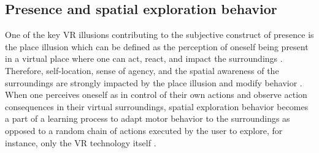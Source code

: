 \subsection{Presence and spatial exploration behavior}

One of the key VR illusions contributing to the subjective construct of presence is the place illusion which can be defined as the perception of oneself being present in a virtual place where one can act, react, and impact the surroundings \cite{Slater2009}. Therefore, self-location, sense of agency, and the spatial awareness of the surroundings are strongly impacted by the place illusion and modify behavior \cite{Kilteni2012}. When one perceives oneself as in control of their own actions and observe action consequences in their virtual surroundings, spatial exploration behavior becomes a part of a learning process to adapt motor behavior to the surroundings as opposed to a random chain of actions executed by the user to explore, for instance, only the VR technology itself \cite{Tan2011}.


